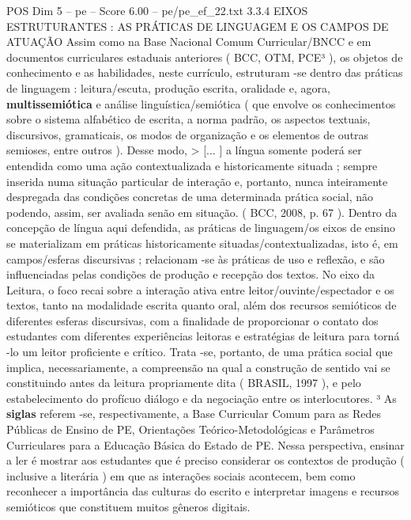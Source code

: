 \begin{textsample}{POS Dim 5 – pe – Score 6.00 – pe/pe\_ef\_22.txt}  \label{ex:f5_pos_203}
3.3.4 EIXOS ESTRUTURANTES : AS PRÁTICAS DE LINGUAGEM E OS CAMPOS DE ATUAÇÃO Assim como na Base Nacional Comum Curricular/BNCC e em documentos curriculares estaduais anteriores ( BCC, OTM, PCE³ ), os objetos de conhecimento e as habilidades, neste currículo, estruturam -se dentro das práticas de linguagem : leitura/escuta, produção escrita, oralidade e, agora, \textbf{multissemiótica} e análise linguística/semiótica ( que envolve os conhecimentos sobre o sistema alfabético de escrita, a norma padrão, os aspectos textuais, discursivos, gramaticais, os modos de organização e os elementos de outras semioses, entre outros ).
Desse modo, > [... ] a língua somente poderá ser entendida como uma ação contextualizada e historicamente situada ; sempre inserida numa situação particular de interação e, portanto, nunca inteiramente despregada das condições concretas de uma determinada prática social, não podendo, assim, ser avaliada senão em situação. ( BCC, 2008, p. 67 ).
Dentro da concepção de língua aqui defendida, as práticas de linguagem/os eixos de ensino se materializam em práticas historicamente situadas/contextualizadas, isto é, em campos/esferas discursivas ; relacionam -se às práticas de uso e reflexão, e são influenciadas pelas condições de produção e recepção dos textos.
No eixo da Leitura, o foco recai sobre a interação ativa entre leitor/ouvinte/espectador e os textos, tanto na modalidade escrita quanto oral, além dos recursos semióticos de diferentes esferas discursivas, com a finalidade de proporcionar o contato dos estudantes com diferentes experiências leitoras e estratégias de leitura para torná -lo um leitor proficiente e crítico.
Trata -se, portanto, de uma prática social que implica, necessariamente, a compreensão na qual a construção de sentido vai se constituindo antes da leitura propriamente dita ( BRASIL, 1997 ), e pelo estabelecimento do profícuo diálogo e da negociação entre os interlocutores. ³ As \textbf{siglas} referem -se, respectivamente, a Base Curricular Comum para as Redes Públicas de Ensino de PE, Orientações Teórico-Metodológicas e Parâmetros Curriculares para a Educação Básica do Estado de PE.
Nessa perspectiva, ensinar a ler é mostrar aos estudantes que é preciso considerar os contextos de produção ( inclusive a literária ) em que as interações sociais acontecem, bem como reconhecer a importância das culturas do escrito e interpretar imagens e recursos semióticos que constituem muitos gêneros digitais.

\end{textsample}

